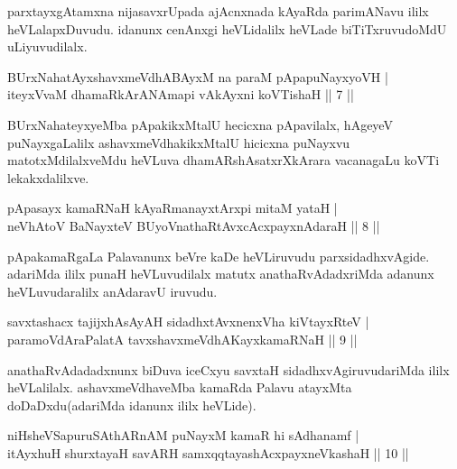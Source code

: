 \begin{artha}
parxtayxgAtamxna nijasavxrUpada ajAcnxnada kAyaRda parimANavu ililx heVLalapxDuvudu. idanunx cenAnxgi heVLidalilx heVLade biTiTxruvudoMdU uLiyuvudilalx.
\end{artha}


\begin{shl}
BUrxNahatAyxshavxmeVdhABAyxM na paraM pApapuNayxyoVH |\\
iteyxVvaM dhamaRkArANAmapi vAkAyxni koVTishaH \hfill || 7 ||
\end{shl}

\begin{artha}
BUrxNahateyxyeMba pApakikxMtalU hecicxna pApavilalx, hAgeyeV puNayxgaLalilx ashavxmeVdhakikxMtalU hicicxna puNayxvu matotxMdilalxveMdu heVLuva dhamARshAsatxrXkArara vacanagaLu koVTi lekakxdalilxve.
\end{artha}


\begin{shl}
pApasayx kamaRNaH kAyaRmanayxtArxpi mitaM yataH |\\
neVhAtoV BaNayxteV  BUyoV\s nathaRtAvxcAcxpayxnAdaraH \hfill || 8 ||
\end{shl}

\begin{artha}
pApakamaRgaLa Palavanunx beVre kaDe heVLiruvudu parxsidadhxvAgide. adariMda ililx punaH heVLuvudilalx matutx anathaRvAdadxriMda adanunx heVLuvudaralilx anAdaravU iruvudu.
\end{artha}

\begin{shl}
savxtashacx tajijxhAsAyAH sidadhxtAvxnenxVha kiVtayxRteV |\\
paramoVdAraPalatA tavxshavxmeVdhAKayxkamaRNaH \hfill || 9 ||
\end{shl}

\begin{artha}
anathaRvAdadadxnunx biDuva iceCxyu savxtaH sidadhxvAgiruvudariMda ililx heVLalilalx. ashavxmeVdhaveMba kamaRda Palavu atayxMta doDaDxdu(adariMda idanunx ililx heVLide).
\end{artha}


\begin{shl}
niHsheVSapuruSAthARnAM puNayxM kamaR hi sAdhanamf |\\
itAyxhuH shurxtayaH savARH samxqqtayashAcxpayxneVkashaH \hfill || 10 ||
\end{shl}

